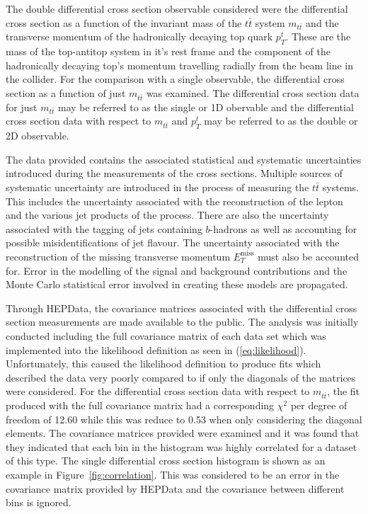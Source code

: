 \documentclass[a4paper,11pt]{article}
\begin{document}
The double differential cross section observable considered  were the differential cross section as a function of the invariant mass of the $t\bar{t}$ system $m_{t\bar{t}}$ and the transverse momentum of the hadronically decaying top quark $p_{T}^{t}$.
These are the mass of the top-antitop system in it's rest frame and the component of the hadronically decaying top's momentum travelling radially from the beam line in the collider.
For the comparison with a single observable, the differential cross section as a function of just $m_{t\bar{t}}$ was examined.
The differential cross section data for just $m_{t\bar{t}}$ may be referred to as the single or 1D obervable and the differential cross section data with respect to $m_{t\bar{t}}$ and $p_{T}^{t}$ may be referred to as the double or 2D observable.

The data provided contains the associated statistical and systematic uncertainties introduced during the measurements of the cross sections.
Multiple sources of systematic uncertainty are introduced in the process of measuring the $t\bar{t}$ systems.
This includes the uncertainty associated with the reconstruction of the lepton and the various jet products of the process.
There are also the uncertainty associated with the tagging of jets containing $b$-hadrons as well as accounting for possible misidentifications of jet flavour.
The uncertainty associated with the reconstruction of the missing transverse momentum $E_{T}^{\text{miss}}$ must also be accounted for.
Error in the modelling of the signal and background contributions and the Monte Carlo statistical error involved in creating these models are propagated.

Through HEPData, the covariance matrices associated with the differential cross section measurements are made available to the public.
The analysis was initially conducted including the full covariance matrix of each data set which was implemented into the likelihood definition as seen in (\ref{eq:likelihood}).
Unfortunately, this caused the likelihood definition to produce fits which described the data very poorly compared to if only the diagonals of the matrices were considered.
For the differential cross section data with respect to $m_{t\bar{t}}$, the fit produced with the full covariance matrix had a corresponding $\chi^2$ per degree of freedom of 12.60 while this was reduce to 0.53 when only considering the diagonal elements.
The covariance matrices provided were examined and it was found that they indicated that each bin in the histogram was highly correlated for a dataset of this type.
The single differential cross section histogram is shown as an example in Figure~\ref{fig:correlation}.
This was considered to be an error in the covariance matrix provided by HEPData and the covariance between different bins is ignored.
\end{document}

